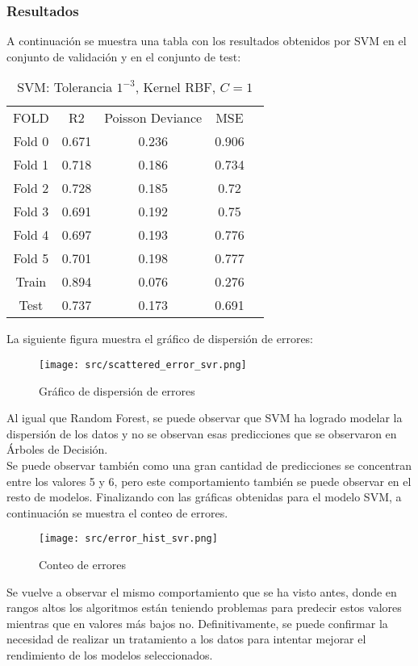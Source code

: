 \subsubsection*{Resultados}
A continuación se muestra una tabla con los resultados obtenidos por SVM en el conjunto de validación y en el conjunto de test:
\begin{table}[H]
	\centering
	\begin{tabular}{|c|c|c|c|c}
		\cline{1-4}
		FOLD   & R2    & Poisson Deviance & MSE   \\ \cline{1-4}
		Fold 0 & 0.671 & 0.236            & 0.906 \\ \cline{1-4}
		Fold 1 & 0.718 & 0.186            & 0.734 \\ \cline{1-4}
		Fold 2 & 0.728 & 0.185            & 0.72  \\ \cline{1-4}
		Fold 3 & 0.691 & 0.192            & 0.75  \\ \cline{1-4}
		Fold 4 & 0.697 & 0.193            & 0.776 \\ \cline{1-4}
		Fold 5 & 0.701 & 0.198            & 0.777 \\ \cline{1-4}
		Train  & 0.894 & 0.076            & 0.276 \\ \cline{1-4}
		Test   & 0.737 & 0.173            & 0.691 \\ \cline{1-4}
	\end{tabular}
	\caption{SVM: Tolerancia $1^{-3}$, Kernel RBF, $C=1$}
	\label{tab:svm_res}
\end{table}
\clearpage
La siguiente figura muestra el gráfico de dispersión de errores:
\begin{figure}[H]
	\centering
	\texttt{[image: src/scattered\_error\_svr.png]}
	\caption{Gráfico de dispersión de errores}
	\label{fig:svr_scattered}
\end{figure}
Al igual que Random Forest, se puede observar que SVM ha logrado modelar la dispersión de los datos y no se observan esas predicciones que se observaron en Árboles de Decisión.\\
Se puede observar también como una gran cantidad de predicciones se concentran entre los valores 5 y 6, pero este comportamiento también se puede observar en el resto de modelos.
\clearpage
Finalizando con las gráficas obtenidas para el modelo SVM, a continuación se muestra el conteo de errores.
\begin{figure}[H]
	\centering
	\texttt{[image: src/error\_hist\_svr.png]}
	\caption{Conteo de errores}
	\label{fig:svr_error_plot}
\end{figure}
Se vuelve a observar el mismo comportamiento que se ha visto antes, donde en rangos altos los algoritmos están teniendo problemas para predecir estos valores mientras que en valores más bajos no. Definitivamente, se puede confirmar la necesidad de realizar un tratamiento a los datos para intentar mejorar el rendimiento de los modelos seleccionados.
\clearpage
